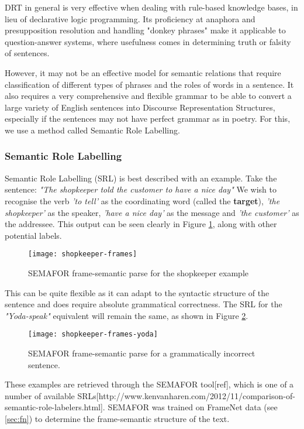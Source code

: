 DRT in general is very effective when dealing with rule-based knowledge bases, in lieu of declarative logic programming. Its proficiency at anaphora and presupposition resolution and handling "donkey phrases" make it applicable to question-answer systems, where usefulness comes in determining truth or falsity of sentences.

However, it may not be an effective model for semantic relations that require classification of different types of phrases and the roles of words in a sentence. It also requires a very comprehensive and flexible grammar to be able to convert a large variety of English sentences into Discourse Representation Structures, especially if the sentences may not have perfect grammar as in poetry. For this, we use a method called Semantic Role Labelling.

\subsubsection{Semantic Role Labelling}
Semantic Role Labelling (SRL) is best described with an example. Take the sentence:
{\centering\textit{"The shopkeeper told the customer to have a nice day"}}
We wish to recognise the verb \textit{'to tell'} as the coordinating word (called the \textbf{target}), \textit{'the shopkeeper'} as the speaker, \textit{'have a nice day'} as the message and \textit{'the customer'} as the addressee. This output can be seen clearly in Figure \ref{fig:shopkeeper-frames}, along with other potential labels. 

\begin{figure}[h!]
\centering
\texttt{[image: shopkeeper-frames]}
\caption{SEMAFOR frame-semantic parse for the shopkeeper example}
\label{fig:shopkeeper-frames}
\end{figure}

This can be quite flexible as it can adapt to the syntactic structure of the sentence and does require absolute grammatical correctness. The SRL for the \textit{"Yoda-speak"} equivalent will remain the same, as shown in Figure \ref{fig:shopkeeper-frames-yoda}.

\begin{figure}[h!]
\centering
\texttt{[image: shopkeeper-frames-yoda]}
\caption{SEMAFOR frame-semantic parse for a grammatically incorrect sentence.}
\label{fig:shopkeeper-frames-yoda}
\end{figure}

These examples are retrieved through the SEMAFOR tool[ref],  which is one of a number of available SRLs[http://www.kenvanharen.com/2012/11/comparison-of-semantic-role-labelers.html]. SEMAFOR was trained on FrameNet data (see \ref{sec:fn}) to determine the frame-semantic structure of the text.

